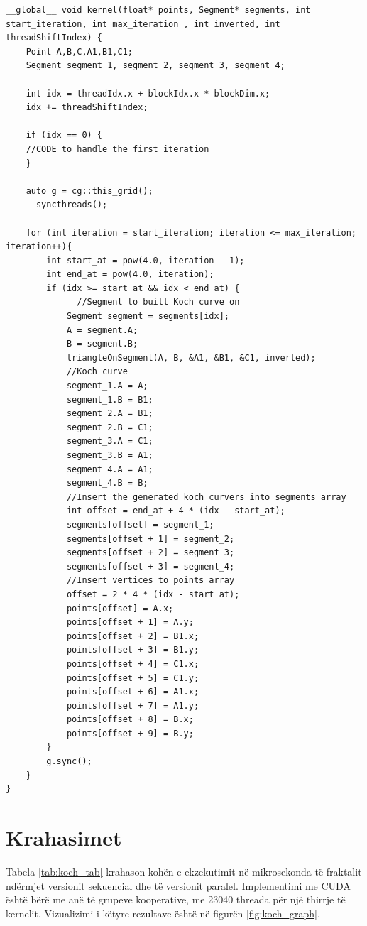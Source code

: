 \begin{lstlisting}
__global__ void kernel(float* points, Segment* segments, int start_iteration, int max_iteration	, int inverted, int threadShiftIndex) {
    Point A,B,C,A1,B1,C1;
    Segment segment_1, segment_2, segment_3, segment_4;
    
    int idx = threadIdx.x + blockIdx.x * blockDim.x;
    idx += threadShiftIndex;
    
    if (idx == 0) {
    //CODE to handle the first iteration
    }

    auto g = cg::this_grid();
    __syncthreads();

    for (int iteration = start_iteration; iteration <= max_iteration; iteration++){
        int start_at = pow(4.0, iteration - 1);
        int end_at = pow(4.0, iteration);
        if (idx >= start_at && idx < end_at) {
              //Segment to built Koch curve on
            Segment segment = segments[idx];
            A = segment.A;
            B = segment.B;
            triangleOnSegment(A, B, &A1, &B1, &C1, inverted);
            //Koch curve
            segment_1.A = A;
            segment_1.B = B1;
            segment_2.A = B1;
            segment_2.B = C1;
            segment_3.A = C1;
            segment_3.B = A1;
            segment_4.A = A1;
            segment_4.B = B;
            //Insert the generated koch curvers into segments array
            int offset = end_at + 4 * (idx - start_at);
            segments[offset] = segment_1;
            segments[offset + 1] = segment_2;
            segments[offset + 2] = segment_3;
            segments[offset + 3] = segment_4;
            //Insert vertices to points array
            offset = 2 * 4 * (idx - start_at);
            points[offset] = A.x;
            points[offset + 1] = A.y;
            points[offset + 2] = B1.x;
            points[offset + 3] = B1.y;
            points[offset + 4] = C1.x;
            points[offset + 5] = C1.y;
            points[offset + 6] = A1.x;
            points[offset + 7] = A1.y;
            points[offset + 8] = B.x;
            points[offset + 9] = B.y;
        }
        g.sync();
    }
}

\end{lstlisting}

\section{Krahasimet}

\noindent Tabela \ref{tab:koch_tab} krahason kohën e ekzekutimit në mikrosekonda të fraktalit ndërmjet versionit sekuencial dhe të versionit paralel. Implementimi me CUDA është bërë me  anë të grupeve kooperative, me 23040 threada për një thirrje të kernelit. Vizualizimi i këtyre rezultave është në figurën \ref{fig:koch_graph}.

